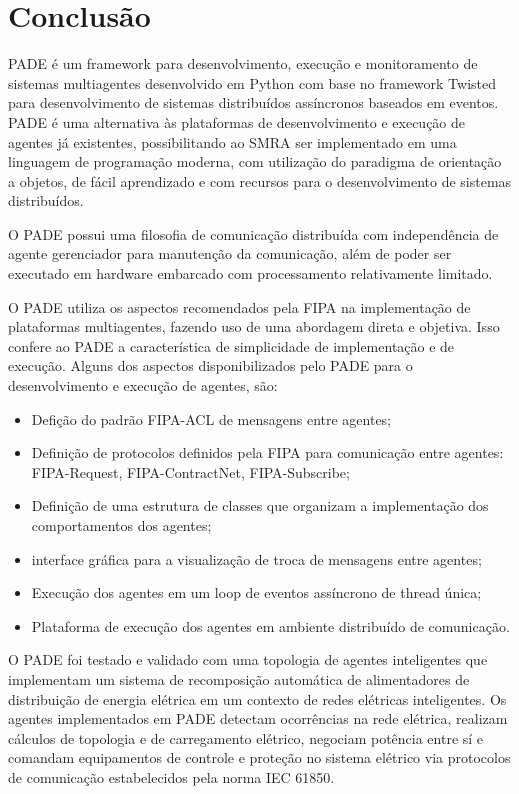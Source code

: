 \documentclass[journal]{IEEEtran}
\begin{document}
\section{Conclusão}

PADE é um framework para desenvolvimento, execução e monitoramento de sistemas multiagentes desenvolvido em Python com base no framework Twisted para desenvolvimento de sistemas distribuídos assíncronos baseados em eventos. PADE é uma alternativa às plataformas de desenvolvimento e execução de agentes já existentes, possibilitando ao SMRA ser implementado em uma linguagem de programação moderna, com utilização do paradigma de orientação a objetos, de fácil aprendizado e com recursos para o desenvolvimento de sistemas distribuídos.

O PADE possui uma filosofia de comunicação distribuída com independência de agente gerenciador para manutenção da comunicação, além de poder ser executado em hardware embarcado com processamento relativamente limitado.

O PADE utiliza os aspectos recomendados pela FIPA na implementação de plataformas multiagentes, fazendo uso de uma abordagem direta e objetiva. Isso confere ao PADE a característica de simplicidade de implementação e de execução. Alguns dos aspectos disponibilizados pelo PADE para o desenvolvimento e execução de agentes, são:

\begin{itemize}
    \item Defição do padrão FIPA-ACL de mensagens entre agentes;
    \item Definição de protocolos definidos pela FIPA para comunicação entre agentes: FIPA-Request, FIPA-ContractNet, FIPA-Subscribe;
    \item Definição de uma estrutura de classes que organizam a implementação dos comportamentos dos agentes;
    \item interface gráfica para a visualização de troca de mensagens entre agentes;
    \item Execução dos agentes em um loop de eventos assíncrono de thread única;
    \item Plataforma de execução dos agentes em ambiente distribuído de comunicação.
\end{itemize}

O PADE foi testado e validado com uma topologia de agentes inteligentes que implementam um sistema de recomposição automática de alimentadores de distribuição de energia elétrica em um contexto de redes elétricas inteligentes. Os agentes implementados em PADE detectam ocorrências na rede elétrica, realizam cálculos de topologia e de carregamento elétrico, negociam potência entre sí e comandam equipamentos de controle e proteção no sistema elétrico via protocolos de comunicação estabelecidos pela norma IEC 61850.
\end{document}
